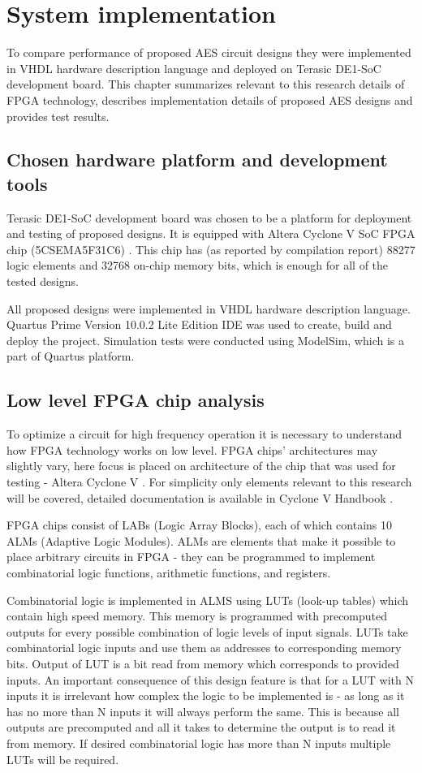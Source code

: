 \section{System implementation}
To compare performance of proposed AES circuit designs they were implemented in VHDL hardware description language and deployed on Terasic DE1-SoC development board. This chapter summarizes relevant to this research details of FPGA technology, describes implementation details of proposed AES designs and provides test results.
   
\subsection{Chosen hardware platform and development tools}
Terasic DE1-SoC development board \cite{plytka} was chosen to be a platform for deployment and testing of proposed designs. It is equipped with Altera Cyclone V SoC FPGA chip (5CSEMA5F31C6) \cite{cycloneVOverview}. This chip has (as reported by compilation report) 88277 logic elements and 32768 on-chip memory bits, which is enough for all of the tested designs.

All proposed designs were implemented in VHDL hardware description language. Quartus Prime Version 10.0.2 Lite Edition IDE was used to create, build and deploy the project. Simulation tests were conducted using ModelSim, which is a part of Quartus platform.

\subsection{Low level FPGA chip analysis}
\label{sec:low-level-fpga}
To optimize a circuit for high frequency operation it is necessary to understand how FPGA technology works on low level. FPGA chips' architectures may slightly vary, here focus is placed on architecture of the chip that was used for testing - Altera Cyclone V \cite[Chapter 1]{altera-vol1}. For simplicity only elements relevant to this research will be covered, detailed documentation is available in Cyclone V Handbook \cite{altera-vol1}.

FPGA chips consist of LABs (Logic Array Blocks), each of which contains 10 ALMs (Adaptive Logic Modules). ALMs are elements that make it possible to place arbitrary circuits in FPGA - they can be programmed to implement combinatorial logic functions, arithmetic functions, and registers.

Combinatorial logic is implemented in ALMS using LUTs (look-up tables) which contain high speed memory. This memory is programmed with precomputed outputs for every possible combination of logic levels of input signals. LUTs take combinatorial logic inputs and use them as addresses to corresponding memory bits. Output of LUT is a bit read from memory which corresponds to provided inputs. An important consequence of this design feature is that for a LUT with N inputs it is irrelevant how complex the logic to be implemented is - as long as it has no more than N inputs it will always perform the same. This is because all outputs are precomputed and all it takes to determine the output is to read it from memory. If desired combinatorial logic has more than N inputs multiple LUTs will be required.

